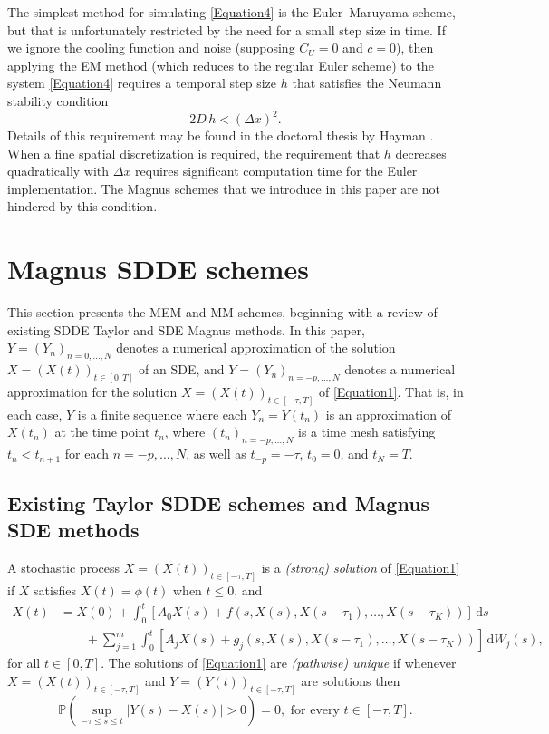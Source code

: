 \documentclass[onefignum]{siamart250211}
\providecommand{\abs}[1]{\left|#1\right|}
\begin{document}
The simplest method for simulating \cref{Equation4} is the Euler--Maruyama scheme, but that is unfortunately restricted by the need for a small step size in time. If we ignore the cooling function and noise (supposing $C_U=0$ and $c=0$), then applying the EM method (which reduces to the regular Euler scheme) to the system \cref{Equation4} requires a temporal step size $h$ that satisfies the Neumann stability condition
\begin{equation}2D\,h<(\Delta x)^2.\label{StabilityCondition}\end{equation}
Details of this requirement may be found in the doctoral thesis by Hayman \cite{Hayman1988}. When a fine spatial discretization is required, the requirement that $h$ decreases quadratically with $\Delta x$ requires significant computation time for the Euler implementation. The Magnus schemes that we introduce in this paper are not hindered by this condition.










\section{Magnus SDDE schemes}\label{Section2}

This section presents the MEM and MM schemes, beginning with a review of existing SDDE Taylor and SDE Magnus methods. In this paper, $Y=(Y_n)_{n=0,\ldots,N}$ denotes a numerical approximation of the solution $X=(X(t))_{t\in[0,T]}$ of an SDE, and $Y=(Y_n)_{n=-p,\ldots,N}$ denotes a numerical approximation for the solution $X=(X(t))_{t\in[-\tau,T]}$ of \cref{Equation1}. That is, in each case, $Y$ is a finite sequence where each $Y_n=Y(t_n)$ is an approximation of $X(t_n)$ at the time point $t_n$, where $(t_n)_{n=-p,\ldots,N}$ is a time mesh satisfying $t_n<t_{n+1}$ for each $n=-p,\ldots,N$, as well as $t_{-p}=-\tau$, $t_0=0$, and $t_N=T$.

\subsection{Existing Taylor SDDE schemes and Magnus SDE methods}\label{Section2.1}

\begin{definition}
A stochastic process $X=(X(t))_{t\in[-\tau,T]}$ is a \emph{(strong) solution} of \cref{Equation1} if $X$ satisfies $X(t)=\phi(t)$ when $t\leqslant0$, and
\begin{align*}
X(t)&=X(0)+\int_0^t[A_0X(s)+f(s,X(s),X(s-\tau_1),\ldots,X(s-\tau_K))]\,\mathrm{d}s\\
&\quad\quad+\sum_{j=1}^m\int_0^t[A_jX(s)+g_j(s,X(s),X(s-\tau_1),\ldots,X(s-\tau_K))]\,\mathrm{d}W_j(s),
\end{align*}
for all $t\in[0,T]$. The solutions of \cref{Equation1} are \emph{(pathwise) unique} if whenever $X=(X(t))_{t\in[-\tau,T]}$ and $Y=(Y(t))_{t\in[-\tau,T]}$ are solutions then
\[\mathbb{P}\left(\sup_{-\tau\leqslant s\leqslant t}\abs{Y(s)-X(s)}>0\right)=0,\textrm{ for every }t\in[-\tau,T].\]
\end{definition}
\end{document}

